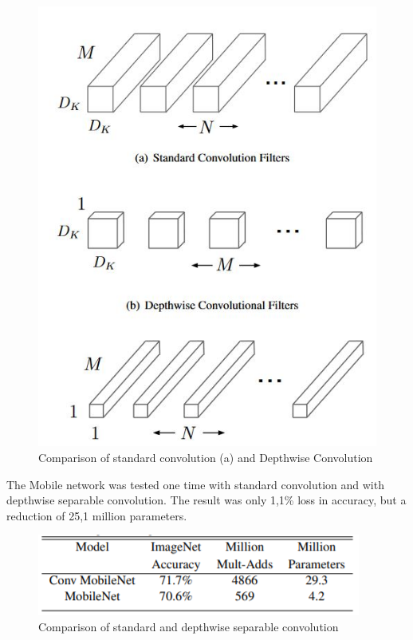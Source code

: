 \begin{figure}[H]
\centering
\includegraphics[scale=0.65]{sources/depthwise_convolution.JPG}
\caption[Comparison standard and depthwise]{Comparison of standard convolution (a) and Depthwise Convolution \cite{tim2,tim3}}
\label{fig:depthwise_convolution}
\end{figure}

The Mobile network was tested one time with standard convolution and with depthwise separable convolution. The result was only 1,1\% loss in accuracy, but a reduction of 25,1 million parameters. 

\begin{figure}[H]
\centering
\includegraphics{sources/Comparison_Mobilenet.png}
\caption[Comparison standard and separable depthwise]{Comparison of standard and depthwise separable convolution}
\label{fig:depthwise_convolution}
\end{figure}

